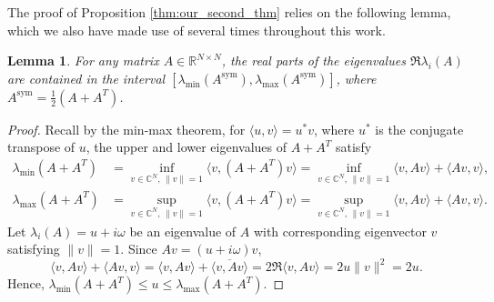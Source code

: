 \documentclass{article} \usepackage{iclr2021_conference,times}
\newtheorem{lemma}{Lemma}
\newcommand{\sym}{\mathrm{sym}}
\begin{document}
The proof of Proposition \ref{thm:our_second_thm} relies on the following lemma, which we also have made use of several times throughout this work. 
\begin{lemma}
\label{lem:SymEigs}
For any matrix $A \in \mathbb{R}^{N \times N}$, the real parts of the eigenvalues $\Re \lambda_i(A)$ are contained in the interval $[\lambda_{\min}(A^{\sym}),\lambda_{\max}(A^{\sym})]$, where $A^{\sym} = \frac12(A + A^T)$. 
\end{lemma}
\begin{proof}
Recall by the min-max theorem, for $\langle u, v \rangle = u^\ast v$, where $u^\ast$ is the conjugate transpose of $u$, the upper and lower eigenvalues of $A + A^T$ satisfy
\begin{align*}
\lambda_{\min}(A + A^T) &= \inf_{v \in \mathbb{C}^N,\, \|v\| = 1} \langle v, (A + A^T) v\rangle = \inf_{v \in \mathbb{C}^N,\, \|v\| = 1} \langle v, A v\rangle + \langle A v, v\rangle,\\
\lambda_{\max}(A + A^T) &= \sup_{v \in \mathbb{C}^N,\, \|v\| = 1} \langle v, (A + A^T) v\rangle = \sup_{v \in \mathbb{C}^N,\, \|v\| = 1} \langle v, A v\rangle + \langle A v, v\rangle.
\end{align*}
Let $\lambda_i(A) = u + i \omega$ be an eigenvalue of $A$ with corresponding eigenvector $v$ satisfying $\|v\| = 1$. Since $A v = (u + i \omega) v$,
\[
\langle v, A v \rangle + \langle A v, v \rangle = \langle v, A v \rangle + \overline{\langle v, A v \rangle} = 2 \Re \langle v, A v \rangle = 2u\|v\|^2 = 2u.
\]
Hence, $\lambda_{\min}(A + A^T) \leq u \leq \lambda_{\max}(A+A^T)$.
\end{proof}
\end{document}
